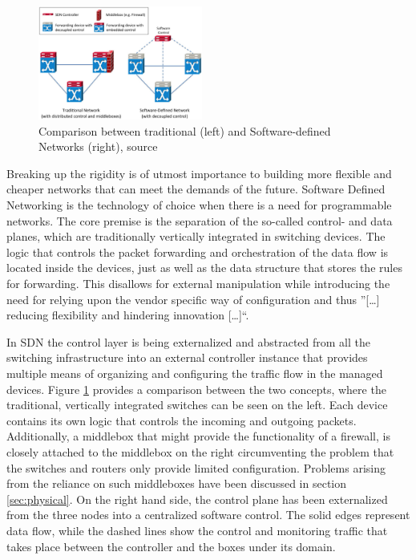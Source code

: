 \begin{figure}[h]
	\centering
	\includegraphics[width=0.48\textwidth]{images/sdn.png}
	\caption{Comparison between traditional (left) and Software-defined Networks (right), source \cite{li2015software}}
	\label{img:sdn}
\end{figure}

Breaking up the rigidity is of utmost importance to building more flexible and cheaper networks that can  meet the demands of the future. Software Defined Networking is the technology of choice when there is a need for programmable networks. The core premise is the separation of the so-called control- and data planes, which are traditionally vertically integrated in switching devices. The logic that controls the packet forwarding and orchestration of the data flow is located inside the devices, just as well as the data structure that stores the rules for forwarding. This disallows for external manipulation while introducing the need for relying upon the vendor specific way of configuration and thus ''[\dots]  reducing flexibility and hindering innovation [\dots]``\cite{kreutz2015software}.

In SDN the control layer is being externalized and abstracted from all the switching infrastructure into an external controller instance that provides multiple means of organizing and configuring the traffic flow in the managed devices. Figure \ref{img:sdn} provides a comparison between the two concepts, where the traditional, vertically integrated switches can be seen on the left. Each device contains its own logic that controls the incoming and outgoing packets. Additionally, a middlebox that might provide the functionality of a firewall, is closely attached to the middlebox on the right circumventing the problem that the switches and routers only provide limited configuration. Problems arising from the reliance on such middleboxes have been discussed in section \ref{sec:physical}.  On the right hand side, the control plane has been externalized from the three nodes into a centralized software control. The solid edges represent data flow, while the dashed lines show the control and monitoring traffic that takes place between the controller and the boxes under its domain.


